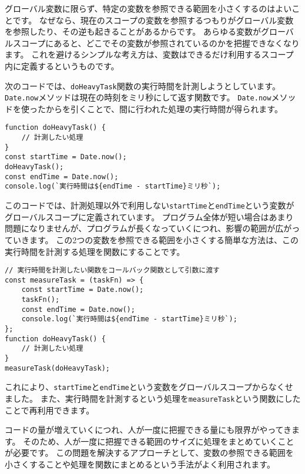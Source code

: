 \begin{tcolorbox}[enhanced jigsaw,breakable,title=変数を参照できる範囲を小さくする]\label{reduce-scope}

グローバル変数に限らず、特定の変数を参照できる範囲を小さくするのはよいことです。
なぜなら、現在のスコープの変数を参照するつもりがグローバル変数を参照したり、その逆も起きることがあるからです。
あらゆる変数がグローバルスコープにあると、どこでその変数が参照されているのかを把握できなくなります。
これを避けるシンプルな考え方は、変数はできるだけ利用するスコープ内に定義するというものです。

次のコードでは、\texttt{doHeavyTask}関数の実行時間を計測しようとしています。
\texttt{Date.now}メソッドは現在の時刻をミリ秒にして返す関数です。
\texttt{Date.now}メソッドを使った\textbf{}から\textbf{}を引くことで、間に行われた処理の実行時間が得られます。

\begin{lstlisting}
function doHeavyTask() {
    // 計測したい処理
}
const startTime = Date.now();
doHeavyTask();
const endTime = Date.now();
console.log(`実行時間は${endTime - startTime}ミリ秒`);
\end{lstlisting}

このコードでは、計測処理以外で利用しない\texttt{startTime}と\texttt{endTime}という変数がグローバルスコープに定義されています。
プログラム全体が短い場合はあまり問題になりませんが、プログラムが長くなっていくにつれ、影響の範囲が広がっていきます。
この2つの変数を参照できる範囲を小さくする簡単な方法は、この実行時間を計測する処理を関数にすることです。

\begin{lstlisting}
// 実行時間を計測したい関数をコールバック関数として引数に渡す
const measureTask = (taskFn) => {
    const startTime = Date.now();
    taskFn();
    const endTime = Date.now();
    console.log(`実行時間は${endTime - startTime}ミリ秒`);
};
function doHeavyTask() {
    // 計測したい処理
}
measureTask(doHeavyTask);
\end{lstlisting}

これにより、\texttt{startTime}と\texttt{endTime}という変数をグローバルスコープからなくせました。
また、実行時間を計測するという処理を\texttt{measureTask}という関数にしたことで再利用できます。

コードの量が増えていくにつれ、人が一度に把握できる量にも限界がやってきます。
そのため、人が一度に把握できる範囲のサイズに処理をまとめていくことが必要です。
この問題を解決するアプローチとして、変数の参照できる範囲を小さくすることや処理を関数にまとめるという手法がよく利用されます。
\end{tcolorbox}

